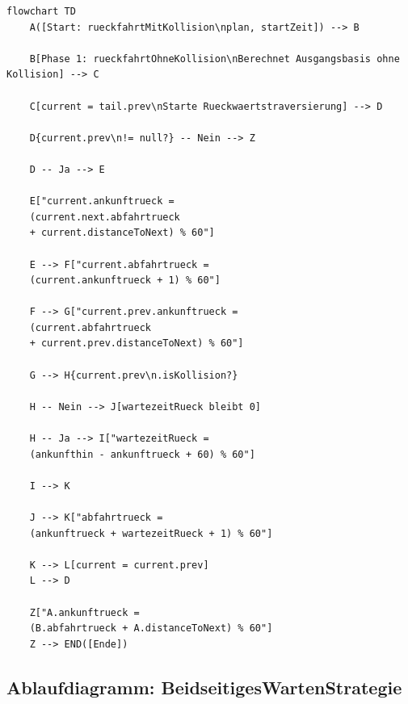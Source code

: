 \documentclass[12pt,a4paper]{article}
\begin{document}
\begin{lstlisting}[style=mermaid, caption={Flussdiagramm -- Algorithmus rueckfahrtMitKollision()}]
flowchart TD
    A([Start: rueckfahrtMitKollision\nplan, startZeit]) --> B

    B[Phase 1: rueckfahrtOhneKollision\nBerechnet Ausgangsbasis ohne Kollision] --> C

    C[current = tail.prev\nStarte Rueckwaertstraversierung] --> D

    D{current.prev\n!= null?} -- Nein --> Z

    D -- Ja --> E

    E["current.ankunftrueck =
    (current.next.abfahrtrueck
    + current.distanceToNext) % 60"]

    E --> F["current.abfahrtrueck =
    (current.ankunftrueck + 1) % 60"]

    F --> G["current.prev.ankunftrueck =
    (current.abfahrtrueck
    + current.prev.distanceToNext) % 60"]

    G --> H{current.prev\n.isKollision?}

    H -- Nein --> J[wartezeitRueck bleibt 0]

    H -- Ja --> I["wartezeitRueck =
    (ankunfthin - ankunftrueck + 60) % 60"]

    I --> K

    J --> K["abfahrtrueck =
    (ankunftrueck + wartezeitRueck + 1) % 60"]

    K --> L[current = current.prev]
    L --> D

    Z["A.ankunftrueck =
    (B.abfahrtrueck + A.distanceToNext) % 60"]
    Z --> END([Ende])
\end{lstlisting}

\subsection{Ablaufdiagramm: BeidseitigesWartenStrategie}
\end{document}
